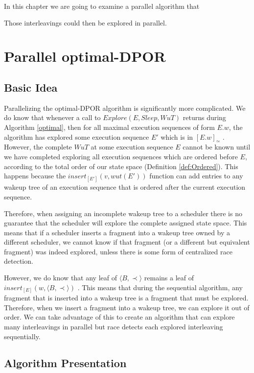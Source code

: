 In this chapter we are going to examine a parallel algorithm that 

 Those 
interleavings could then be explored in parallel.


\section{Parallel optimal-DPOR}

\subsection{Basic Idea}

Parallelizing the optimal-DPOR algorithm is significantly more complicated. We do know that whenever a call to 
$Explore(E, Sleep, WuT)$ returns during Algorithm \ref{optimal}, then for all maximal execution sequences
of form $E.w$, the algorithm has explored some execution sequence $E'$ which is in $[E.w]_\simeq$ \cite{AbdullaAronisJohnssonSagonasDPOR2014}.
However, the complete $WuT$ at some execution sequence $E$ cannot be known until we have completed
exploring all execution sequences which are ordered before $E$, according to the total order of our state space
(Definition \ref{def:Ordered}). This happens because the $insert_{[E']}(v,wut(E'))$ function can add
entries to any wakeup tree of an execution sequence that is ordered after the current execution sequence.

Therefore, when assigning an incomplete wakeup tree to a scheduler there is no
guarantee that the scheduler will explore the complete assigned state space. This means that if a
scheduler inserts a fragment into a wakeup tree owned by a different scheduler, we cannot know if that 
fragment (or a different but equivalent fragment) was indeed explored, unless there is some form of
centralized race detection.

However, we do know that any leaf of $\langle B , \prec \rangle$ remains a leaf of $insert_{[E]}(w,\langle B , \prec \rangle)$
\cite{AbdullaAronisJohnssonSagonasDPOR2014}. This means that during the sequential algorithm, any fragment that
is inserted into a wakeup tree is a fragment that must be explored. Therefore, when we insert a fragment into a wakeup tree,
we can explore it out of order. We can take advantage of this to create an algorithm that can explore many interleavings in parallel
but race detects each explored interleaving sequentially.

\subsection{Algorithm Presentation}

